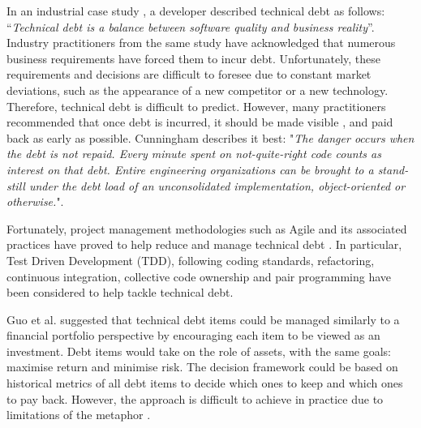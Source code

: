 \documentclass{mprop}
\begin{document}
In an industrial case study \cite{Lim2012}, a developer described technical debt
as follows: ``\textit{Technical debt is a balance between software quality and
business reality}''. Industry practitioners from the same study have
acknowledged that numerous business requirements have forced them to incur debt.
Unfortunately, these requirements and decisions are difficult to foresee due to
constant market deviations, such as the appearance of a new competitor or a new
technology. Therefore, technical debt is difficult to predict. However, many
practitioners recommended that once debt is incurred, it should be made visible
\cite{Lim2012} \cite{Codabux2013} \cite{Morgenthaler2012}, and paid back as
early as possible. Cunningham \cite{Cunningham1993} describes it best:
"\textit{The danger occurs when the debt is not repaid. Every minute spent on
not-quite-right code counts as interest on that debt. Entire engineering
organizations can be brought to a stand-still under the debt load of an
unconsolidated implementation, object-oriented or otherwise.}".

Fortunately, project management methodologies such as Agile and its associated
practices have proved to help reduce and manage technical debt
\cite{Holvitie2014} \cite{Trumler2016}. In particular, Test Driven Development (TDD),
following coding standards, refactoring, continuous integration, collective code
ownership and pair programming have been considered to help tackle technical
debt.

Guo et al. \cite{Guo2011} suggested that technical debt items could be managed
similarly to a financial portfolio perspective by encouraging each item to be
viewed as an investment. Debt items would take on the role of assets, with the
same goals: maximise return and minimise risk. The decision framework could be
based on historical metrics of all debt items to decide which ones to keep and
which ones to pay back. However, the approach is difficult to achieve in
practice due to limitations of the metaphor \cite{Schmid2013}.
\end{document}
